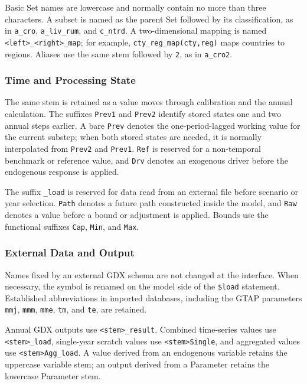 Basic Set names are lowercase and normally contain no more than three characters. A subset is named as the parent Set followed by its classification, as in \texttt{a\_cro}, \texttt{a\_liv\_rum}, and \texttt{c\_ntrd}. A two-dimensional mapping is named \texttt{<left>\_<right>\_map}; for example, \texttt{cty\_reg\_map(cty,reg)} maps countries to regions. Aliases use the same stem followed by \texttt{2}, as in \texttt{a\_cro2}.

\subsubsection{Time and Processing State}

The same stem is retained as a value moves through calibration and the annual calculation. The suffixes \texttt{Prev1} and \texttt{Prev2} identify stored states one and two annual steps earlier. A bare \texttt{Prev} denotes the one-period-lagged working value for the current substep; when both stored states are needed, it is normally interpolated from \texttt{Prev2} and \texttt{Prev1}. \texttt{Ref} is reserved for a non-temporal benchmark or reference value, and \texttt{Drv} denotes an exogenous driver before the endogenous response is applied.

The suffix \texttt{\_load} is reserved for data read from an external file before scenario or year selection. \texttt{Path} denotes a future path constructed inside the model, and \texttt{Raw} denotes a value before a bound or adjustment is applied. Bounds use the functional suffixes \texttt{Cap}, \texttt{Min}, and \texttt{Max}.

\subsubsection{External Data and Output}

Names fixed by an external GDX schema are not changed at the interface. When necessary, the symbol is renamed on the model side of the \texttt{\$load} statement. Established abbreviations in imported databases, including the GTAP parameters \texttt{mmj}, \texttt{mmm}, \texttt{mme}, \texttt{tm}, and \texttt{te}, are retained.

Annual GDX outputs use \texttt{<stem>\_result}. Combined time-series values use \texttt{<stem>\_load}, single-year scratch values use \texttt{<stem>Single}, and aggregated values use \texttt{<stem>Agg\_load}. A value derived from an endogenous variable retains the uppercase variable stem; an output derived from a Parameter retains the lowercase Parameter stem.

